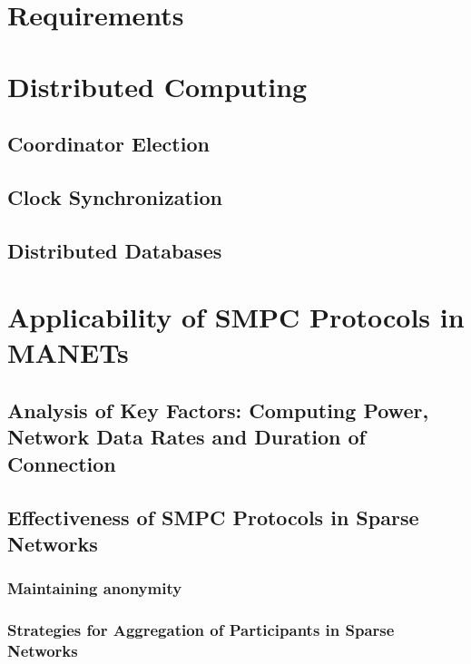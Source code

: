 	\section{Requirements}
	

	\section{Distributed Computing}

		\subsection*{Coordinator Election}
		
		\subsection*{Clock Synchronization}
		
		\subsection*{Distributed Databases}
		
	\section{Applicability of \gls{SMPC} Protocols in \gls{MANET}s}
	
		\subsection*{Analysis of Key Factors: Computing Power, Network Data Rates and Duration of Connection}
		
		\subsection*{Effectiveness of \gls{SMPC} Protocols in Sparse Networks}
		
			\subsubsection*{Maintaining anonymity}
		
			\subsubsection*{Strategies for Aggregation of Participants in Sparse Networks}
			
